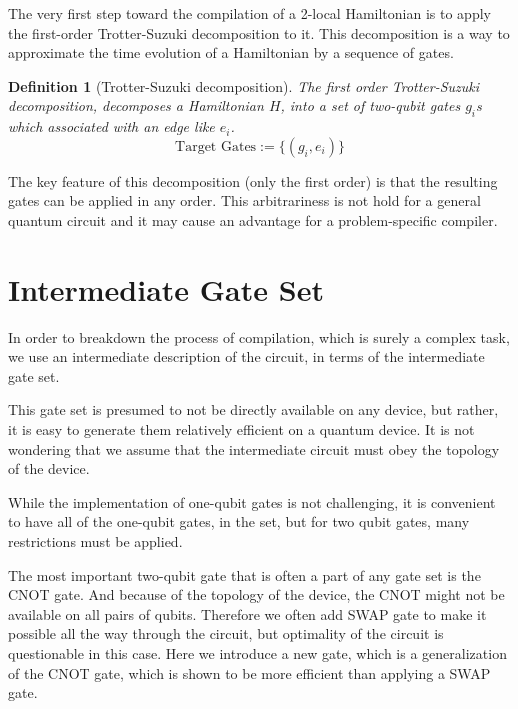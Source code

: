 \documentclass{article}
\newtheorem{defn}{Definition}
\begin{document}
  The very first step toward the compilation of a 2-local Hamiltonian is to apply the first-order Trotter-Suzuki decomposition \cite{trotter1959} to it. This decomposition is a way to approximate the time evolution of a Hamiltonian by a sequence of gates. 

  \begin{defn}[Trotter-Suzuki decomposition]
    \label{defn:trotter-suzuki}
    The first order Trotter-Suzuki decomposition, decomposes a Hamiltonian $H$, into a set of two-qubit gates $g_i$s which associated with an edge like $e_i$.
    \begin{equation}
      \text{Target Gates} := \{ (g_i, e_i) \}
    \end{equation}
  \end{defn}

  The key feature of this decomposition (only the first order) is that the resulting gates can be applied in any order. This arbitrariness is not hold for a general quantum circuit and it may cause an advantage for a problem-specific compiler. %
  

  \section{Intermediate Gate Set}

  In order to breakdown the process of compilation, which is surely a complex task, we use an intermediate description of the circuit, in terms of the intermediate gate set.

  This gate set is presumed to not be directly available on any device, but rather, it is easy to generate them relatively efficient on a quantum device. It is not wondering that we assume that the intermediate circuit must obey the topology of the device.

  While the implementation of one-qubit gates is not challenging, it is convenient to have all of the one-qubit gates, in the set, but for two qubit gates, many restrictions must be applied.

  The most important two-qubit gate that is often a part of any gate set is the CNOT gate. And because of the topology of the device, the CNOT might not be available on all pairs of qubits. Therefore we often add SWAP gate to make it possible all the way through the circuit, but optimality of the circuit is questionable in this case. Here we introduce a new gate, which is a generalization of the CNOT gate, which is shown to be more efficient than applying a SWAP gate.
\end{document}
